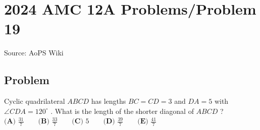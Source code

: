 \documentclass[12pt]{article}
\begin{document}
\section*{{2024 AMC 12A Problems/Problem 19}}
Source: AoPS Wiki

\subsection*{Problem}
Cyclic quadrilateral $ABCD$ has lengths $BC=CD=3$ and $DA=5$ with $\angle CDA=120^\circ$ . What is the length of the shorter diagonal of $ABCD$ ? $\textbf{(A) }\frac{31}7 \qquad \textbf{(B) }\frac{33}7 \qquad \textbf{(C) }5 \qquad \textbf{(D) }\frac{39}7 \qquad \textbf{(E) }\frac{41}7 \qquad$
\end{document}
